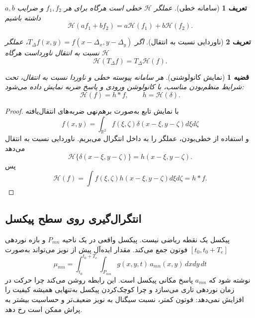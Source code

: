 \documentclass[12pt,openany,oneside]{book}
\newtheorem{definition}{تعریف}[chapter]
\newtheorem{theorem}{قضیه}[chapter]
\newcommand{\R}{\mathbb{R}}
\newcommand{\op}[1]{\mathcal{#1}}
\begin{document}
\begin{definition}[سامانه خطی]
عملگر \(\op H\) خطی است هرگاه برای هر \(f_1,f_2\) و ضرایب \(a,b\) داشته باشیم
\begin{equation}
\op H(af_1+bf_2)=a\op H(f_1)+b\op H(f_2).
\end{equation}
\end{definition}

\begin{definition}[ناوردایی نسبت به انتقال]
اگر \(T_{\Delta}f(x,y)=f(x-\Delta_x,y-\Delta_y)\)، عملگر \(\op H\) نسبت به انتقال ناورداست هرگاه
\begin{equation}
\op H(T_{\Delta}f)=T_{\Delta}\op H(f).
\end{equation}
\end{definition}

\begin{theorem}[نمایش کانولوشنی]
هر سامانه پیوسته خطی و ناوردا نسبت به انتقال، تحت شرایط منظم‌بودن مناسب، با کانولوشن ورودی و پاسخ ضربه نمایش داده می‌شود:
\begin{equation}
\op H(f)=h*f,
\qquad h=\op H(\delta).
\end{equation}
\end{theorem}

\begin{proof}
با نمایش تابع به‌صورت برهم‌نهی ضربه‌های انتقال‌یافته
\begin{equation}
f(x,y)=\int_{\R^2}f(\xi,\zeta)\delta(x-\xi,y-\zeta)d\xi d\zeta
\end{equation}
و استفاده از خطی‌بودن، عملگر را به داخل انتگرال می‌بریم. ناوردایی نسبت به انتقال می‌دهد
\begin{equation}
\op H\{\delta(x-\xi,y-\zeta)\}=h(x-\xi,y-\zeta).
\end{equation}
پس
\begin{equation}
\op H(f)=\int f(\xi,\zeta)h(x-\xi,y-\zeta)d\xi d\zeta=h*f.
\end{equation}
\end{proof}

\subsection{انتگرال‌گیری روی سطح پیکسل}

پیکسل یک نقطه ریاضی نیست. پیکسل واقعی در یک ناحیه \(P_{mn}\) و بازه نوردهی
\([t_0,t_0+T_e]\) فوتون جمع می‌کند. مقدار ایده‌آل پیش از نویز می‌تواند به‌صورت
\begin{equation}
\mu_{mn}=\int_{t_0}^{t_0+T_e}\int_{P_{mn}}g(x,y,t)\,a_{mn}(x,y)\,dxdy\,dt
\label{eq:pixel-integration}
\end{equation}
نوشته شود که \(a_{mn}\) پاسخ مکانی پیکسل است.
این رابطه روشن می‌کند چرا حرکت در زمان نوردهی تاری می‌سازد و چرا کوچک‌کردن پیکسل
به‌تنهایی همیشه کیفیت را افزایش نمی‌دهد: فوتون کمتر، نسبت سیگنال به نویز ضعیف‌تر و حساسیت بیشتر به پراش ممکن است رخ دهد.
\end{document}
